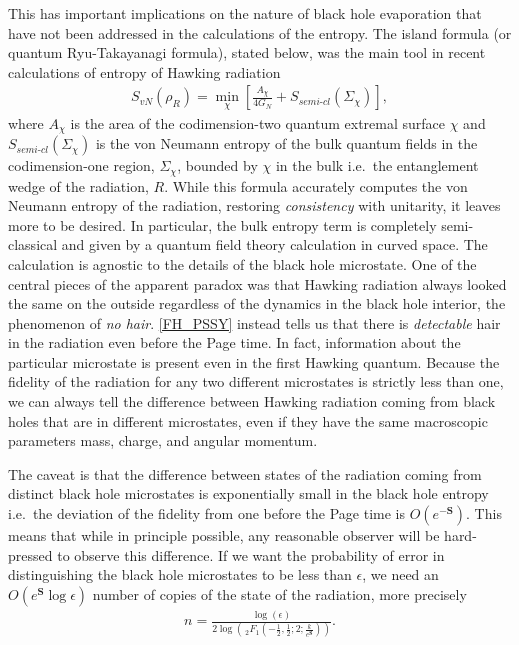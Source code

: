 \documentclass[a4paper,11pt]{article}
\begin{document}
This has important implications on the nature of black hole evaporation that have not been addressed in the calculations of the entropy. The island formula (or quantum Ryu-Takayanagi formula), stated below, was the main tool in recent calculations of entropy of Hawking radiation
\cite{2015JHEP...01..073E, 2020arXiv200606872A}
\begin{align}
    S_{vN}(\rho_R) = \min_{\chi}\left[\frac{A_{\chi}}{4G_N}+S_{
    \textit{semi-cl}}(\Sigma_{\chi}) \right],
\end{align}
where $A_{\chi}$ is the area of the codimension-two quantum extremal surface $\chi$ and $S_{\textit{semi-cl}}(\Sigma_{\chi})$ is the von Neumann entropy of the bulk quantum fields in the codimension-one region, $\Sigma_{\chi}$, bounded by $\chi$ in the bulk i.e.~the entanglement wedge of the radiation, $R$. While this formula accurately computes the von Neumann entropy of the radiation, restoring \textit{consistency} with unitarity, it leaves more to be desired. In particular, the bulk entropy term is completely semi-classical and given by a quantum field theory calculation in curved space. The calculation is agnostic to the details of the black hole microstate. One of the central pieces of the apparent paradox was that Hawking radiation always looked the same on the outside regardless of the dynamics in the black hole interior, the phenomenon of \textit{no hair}. \eqref{FH_PSSY} instead tells us that there is \textit{detectable} hair in the radiation even before the Page time. In fact, information about the particular microstate is present even in the first Hawking quantum. Because the fidelity of the radiation for any two different microstates is strictly less than one, we can always tell the difference between Hawking radiation coming from black holes that are in different microstates, even if they have the same macroscopic parameters mass, charge, and angular momentum. 

The caveat is that the difference between states of the radiation coming from distinct black hole microstates is exponentially small in the black hole entropy i.e.~the deviation of the fidelity from one before the Page time is $O(e^{-\textbf{S}})$. This means that while in principle possible, any reasonable observer will be hard-pressed to observe this difference. If we want the probability of error in distinguishing the black hole microstates to be less than $\epsilon$, we need an $O(e^{\textbf{S}}\log \epsilon)$ number of copies of the state of the radiation, more precisely
\begin{align}
    n =  \frac{\log (\epsilon )}{2 \log \left(\,
   _2F_1\left(-\frac{1}{2},\frac{1}{2};2;\frac{k}{e^{\textbf{S}}
   }\right)\right)}.
\end{align}
\end{document}
